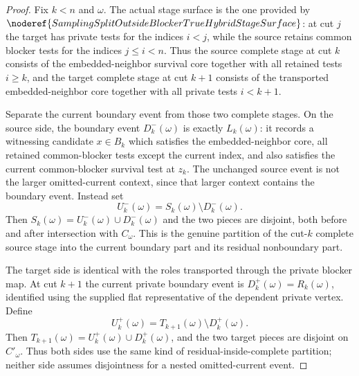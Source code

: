 \begin{proof}
Fix \(k<n\) and \(\omega\).  The actual stage surface is the one provided by
\(\noderef{SamplingSplitOutsideBlockerTrueHybridStageSurface}\): at cut \(j\)
the target has private tests for the indices \(i<j\), while the source
retains common blocker tests for the indices \(j\le i<n\).  Thus the source
complete stage at cut \(k\) consists of the embedded-neighbor survival core
together with all retained tests \(i\ge k\), and the target complete stage at
cut \(k+1\) consists of the transported embedded-neighbor core together with
all private tests \(i<k+1\).

Separate the current boundary event from those two complete stages.  On the
source side, the boundary event \(D^-_k(\omega)\) is exactly
\(L_k(\omega)\): it records a witnessing candidate \(x\in B_k\) which
satisfies the embedded-neighbor core, all retained common-blocker tests
except the current index, and also satisfies the current common-blocker
survival test at \(z_k\).  The unchanged source event is not the larger
omitted-current context, since that larger context contains the boundary
event.  Instead set
\[
U^-_k(\omega)=S_k(\omega)\setminus D^-_k(\omega).
\]
Then \(S_k(\omega)=U^-_k(\omega)\cup D^-_k(\omega)\) and the two pieces are
disjoint, both before and after intersection with \(C_\omega\).  This is the
genuine partition of the cut-\(k\) complete source stage into the current
boundary part and its residual nonboundary part.

The target side is identical with the roles transported through the private
blocker map.  At cut \(k+1\) the current private boundary event is
\(D^+_k(\omega)=R_k(\omega)\), identified using the supplied flat
representative of the dependent private vertex.  Define
\[
U^+_k(\omega)=T_{k+1}(\omega)\setminus D^+_k(\omega).
\]
Then \(T_{k+1}(\omega)=U^+_k(\omega)\cup D^+_k(\omega)\), and the two target
pieces are disjoint on \(C'_\omega\).  Thus both sides use the same kind of
residual-inside-complete partition; neither side assumes disjointness for a
nested omitted-current event.


\end{proof}
